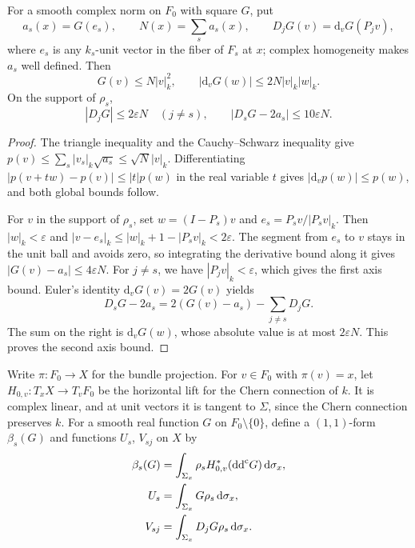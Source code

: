 \begin{lemma}\label{lem:convex-norm-axis-estimates}
For a smooth complex norm on $F_0$ with square $G$, put
\[
 a_s(x)=G(e_s),\qquad N(x)=\sum_sa_s(x),\qquad
 D_jG(v)=\mathrm d_vG(P_jv),
\]
where $e_s$ is any $k_s$-unit vector in the fiber of $F_s$ at $x$; complex homogeneity makes $a_s$ well defined. Then
\[
 G(v)\leq N|v|_k^2,\qquad
 |\mathrm d_vG(w)|\leq2N|v|_k|w|_k.
\]
On the support of $\rho_s$,
\[
 |D_jG|\leq2\varepsilon N\quad(j\ne s),\qquad
 |D_sG-2a_s|\leq10\varepsilon N.
\]
\end{lemma}
\begin{proof}
The triangle inequality and the Cauchy--Schwarz inequality give
$p(v)\leq\sum_s|v_s|_k\sqrt{a_s}\leq\sqrt N|v|_k$.
Differentiating $|p(v+tw)-p(v)|\leq|t|p(w)$ in the real variable $t$ gives
$|\mathrm d_vp(w)|\leq p(w)$, and both global bounds follow.

For $v$ in the support of $\rho_s$, set $w=(I-P_s)v$ and $e_s=P_sv/|P_sv|_k$. Then $|w|_k<\varepsilon$ and
$|v-e_s|_k\leq|w|_k+1-|P_sv|_k<2\varepsilon$.
The segment from $e_s$ to $v$ stays in the unit ball and avoids zero, so integrating the derivative bound along it gives $|G(v)-a_s|\leq4\varepsilon N$. For $j\ne s$, we have $|P_jv|_k<\varepsilon$, which gives the first axis bound. Euler's identity $\mathrm d_vG(v)=2G(v)$ yields
\[
 D_sG-2a_s=2(G(v)-a_s)-\sum_{j\ne s}D_jG.
\]
The sum on the right is $\mathrm d_vG(w)$, whose absolute value is at most $2\varepsilon N$. This proves the second axis bound.
\end{proof}

Write $\pi\colon F_0\to X$ for the bundle projection. For $v\in F_0$ with $\pi(v)=x$, let $H_{0,v}\colon T_xX\to T_vF_0$ be the horizontal lift for the Chern connection of $k$. It is complex linear, and at unit vectors it is tangent to $\Sigma$, since the Chern connection preserves $k$. For a smooth real function $G$ on $F_0\setminus\{0\}$, define a $(1,1)$-form $\beta_s(G)$ and functions $U_s$, $V_{sj}$ on $X$ by
\[
 \begin{aligned}
 \beta_s(G)&=\int_{\Sigma_x}\rho_s H_{0,v}^*(\mathrm{dd}^{\mathrm{c}} G)\,\mathrm d\sigma_x,\\
 U_s&=\int_{\Sigma_x}G\rho_s\,\mathrm d\sigma_x,\\
 V_{sj}&=\int_{\Sigma_x}D_jG\rho_s\,\mathrm d\sigma_x.
 \end{aligned}
\]

